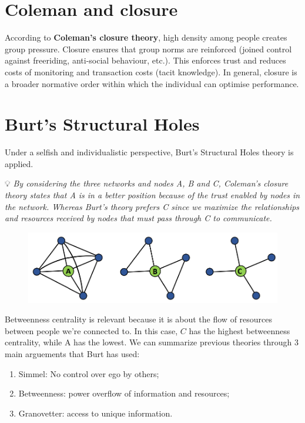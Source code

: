 \documentclass[
  notitlepage,
  onecolumn,
  openany]{book}
\providecommand{\tightlist}{%
  \setlength{\itemsep}{0pt}\setlength{\parskip}{0pt}}
\begin{document}
\hypertarget{coleman-and-closure}{%
\section{Coleman and closure}\label{coleman-and-closure}}

According to \textbf{Coleman's closure theory}, high density among people creates group pressure. Closure ensures that group norms are reinforced (joined control against freeriding, anti-social behaviour, etc.). This enforces trust and reduces costs of monitoring and transaction costs (tacit knowledge). In general, closure is a broader normative order within which the individual can optimise performance.

\hypertarget{burts-structural-holes}{%
\section{Burt's Structural Holes}\label{burts-structural-holes}}

Under a selfish and individualistic perspective, Burt's Structural Holes theory is applied.

💡 \emph{By considering the three networks and nodes A, B and C, Coleman's closure theory states that A is in a better position because of the trust enabled by nodes in the network. Whereas Burt's theory prefers C since we maximize the relationships and resources received by nodes that must pass through C to communicate.}

\begin{figure}[h!]

{\centering \includegraphics[width=0.5\linewidth]{images/07-Triads and structural holes/Untitled 2} 

}

\end{figure}

Betweenness centrality is relevant because it is about the flow of resources between people we're connected to. In this case, \(C\) has the highest betweenness centrality, while A has the lowest. We can summarize previous theories through \(3\) main arguements that Burt has used:

\begin{enumerate}
\def\labelenumi{\arabic{enumi}.}
\tightlist
\item
  Simmel: No control over ego by others;
\item
  Betweenness: power overflow of information and resources;
\item
  Granovetter: access to unique information.
\end{enumerate}
\end{document}
